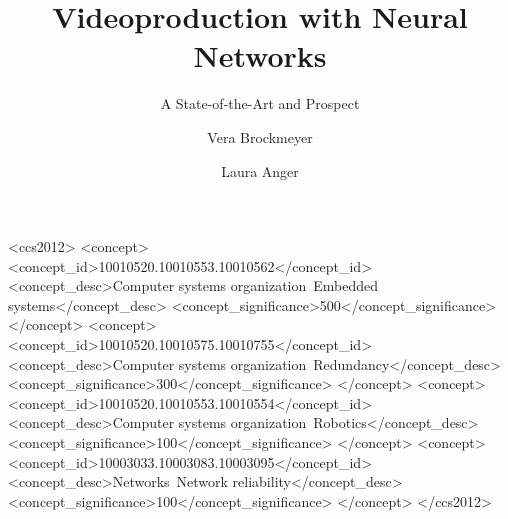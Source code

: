 \documentclass[sigconf]{acmart}
\begin{document}
	\title{Videoproduction with Neural Networks}
	\subtitle{A State-of-the-Art and Prospect}
	
	
	\author{Vera Brockmeyer}
	
	\author{Laura Anger}
	
	\begin{abstract}
		
	\end{abstract}
	
	\begin{CCSXML}
		<ccs2012>
		<concept>
		<concept_id>10010520.10010553.10010562</concept_id>
		<concept_desc>Computer systems organization~Embedded systems</concept_desc>
		<concept_significance>500</concept_significance>
		</concept>
		<concept>
		<concept_id>10010520.10010575.10010755</concept_id>
		<concept_desc>Computer systems organization~Redundancy</concept_desc>
		<concept_significance>300</concept_significance>
		</concept>
		<concept>
		<concept_id>10010520.10010553.10010554</concept_id>
		<concept_desc>Computer systems organization~Robotics</concept_desc>
		<concept_significance>100</concept_significance>
		</concept>
		<concept>
		<concept_id>10003033.10003083.10003095</concept_id>
		<concept_desc>Networks~Network reliability</concept_desc>
		<concept_significance>100</concept_significance>
		</concept>
		</ccs2012> 
	\end{CCSXML}
	
	
	



\maketitle








	

 
\end{document}
